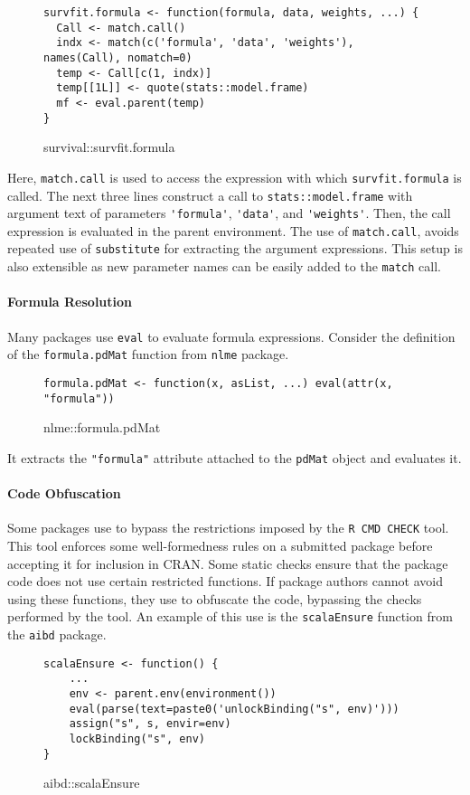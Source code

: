 \documentclass[screen,acmsmall]{acmart}%
\newcommand{\code}[1]{\lstinline |#1|\xspace}
\begin{document}
\begin{figure}[h]
\begin{lstlisting}
survfit.formula <- function(formula, data, weights, ...) {
  Call <- match.call()
  indx <- match(c('formula', 'data', 'weights'), names(Call), nomatch=0)
  temp <- Call[c(1, indx)]
  temp[[1L]] <- quote(stats::model.frame)
  mf <- eval.parent(temp)
}
\end{lstlisting}
  \caption{survival::survfit.formula}
\end{figure}

Here, \code{match.call} is used to access the expression with which
\code{survfit.formula} is called. The next three lines construct a call to
\code{stats::model.frame} with argument text of parameters \code{'formula'},
\code{'data'}, and \code{'weights'}. Then, the call expression is evaluated in
the parent environment. The use of \code{match.call}, avoids repeated use of
\code{substitute} for extracting the argument expressions. This setup is also
extensible as new parameter names can be easily added to the \code{match} call.

\paragraph{Formula Resolution} Many packages use \code{eval} to evaluate formula
expressions. Consider the definition of the \code{formula.pdMat} function from
\code{nlme} package.

\begin{figure}[h]
\begin{lstlisting}
formula.pdMat <- function(x, asList, ...) eval(attr(x, "formula"))
\end{lstlisting}
  \caption{nlme::formula.pdMat}
\end{figure}

It extracts the \code{"formula"} attribute attached to the \code{pdMat} object
and evaluates it.


\paragraph{Code Obfuscation} Some packages use \eval to bypass the restrictions
imposed by the \code{R CMD CHECK} tool. This tool enforces some well-formedness
rules on a submitted package before accepting it for inclusion in CRAN. Some
static checks ensure that the package code does not use certain restricted
functions. If package authors cannot avoid using these functions, they use \eval
to obfuscate the code, bypassing the checks performed by the tool. An example of
this use is the \code{scalaEnsure} function from the \code{aibd} package.
\begin{figure}[h]
\begin{lstlisting}
scalaEnsure <- function() {
    ...
    env <- parent.env(environment())
    eval(parse(text=paste0('unlockBinding("s", env)')))
    assign("s", s, envir=env)
    lockBinding("s", env)
}
\end{lstlisting}
  \caption{aibd::scalaEnsure}
\end{figure}
\end{document}
